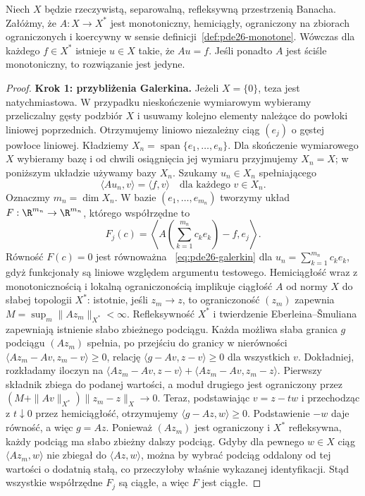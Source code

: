 \begin{twierdzenie}
\label{thm:pde26-minty}
Niech $X$ będzie rzeczywistą, separowalną, refleksywną
przestrzenią Banacha. Załóżmy, że $A:X\to X^*$ jest
monotoniczny, hemiciągły, ograniczony na zbiorach ograniczonych
i koercywny w sensie definicji~\ref{def:pde26-monotone}.
Wówczas dla każdego $f\in X^*$ istnieje $u\in X$ takie, że
$Au=f$. Jeśli ponadto $A$ jest ściśle monotoniczny,
to rozwiązanie jest jedyne.
\end{twierdzenie}
\begin{proof}
\textbf{Krok 1: przybliżenia Galerkina.}
Jeżeli $X=\{0\}$, teza jest natychmiastowa.
W przypadku nieskończenie wymiarowym wybieramy
przeliczalny gęsty podzbiór $X$ i usuwamy kolejno
elementy należące do powłoki liniowej poprzednich.
Otrzymujemy liniowo niezależny ciąg $(e_j)$
o gęstej powłoce liniowej. Kładziemy
$X_n=\operatorname{span}\{e_1,\ldots,e_n\}$.
Dla skończenie wymiarowego $X$ wybieramy bazę
i od chwili osiągnięcia jej wymiaru przyjmujemy
$X_n=X$; w poniższym układzie używamy bazy $X_n$.
Szukamy $u_n\in X_n$ spełniającego
\begin{equation}\label{eq:pde26-galerkin}
 \langle Au_n,v\rangle=\langle f,v\rangle
 \quad\text{dla każdego }v\in X_n.
\end{equation}
Oznaczmy $m_n=\dim X_n$. W bazie
$(e_1,\ldots,e_{m_n})$ tworzymy układ
$F:\R^{m_n}\to\R^{m_n}$, którego współrzędne to
\[
 F_j(c)=\left\langle A\left(\sum_{k=1}^{m_n}c_ke_k\right)
                      -f,e_j\right\rangle.
\]
Równość $F(c)=0$ jest równoważna
~\eqref{eq:pde26-galerkin} dla $u_n=\sum_{k=1}^{m_n}c_ke_k$,
gdyż funkcjonały są liniowe względem argumentu testowego.
Hemiciągłość wraz z monotonicznością i lokalną
ograniczonością implikuje ciągłość $A$ od normy $X$
do słabej topologii $X^*$: istotnie, jeśli $z_m\to z$,
to ograniczoność $(z_m)$ zapewnia
$M=\sup_m\|Az_m\|_{X^*}<\infty$.
Refleksywność $X^*$ i twierdzenie Eberleina--Šmuliana
zapewniają istnienie słabo zbieżnego podciągu.
Każda możliwa słaba granica $g$ podciągu $(Az_m)$
spełnia, po przejściu do granicy w nierówności
$\langle Az_m-Av,z_m-v\rangle\ge0$,
relację $\langle g-Av,z-v\rangle\ge0$ dla wszystkich $v$.
Dokładniej, rozkładamy iloczyn na
$\langle Az_m-Av,z-v\rangle+
\langle Az_m-Av,z_m-z\rangle$.
Pierwszy składnik zbiega do podanej wartości,
a moduł drugiego jest ograniczony przez
$(M+\|Av\|_{X^*})\|z_m-z\|_X\to0$.
Teraz,
podstawiając $v=z-tw$ i przechodząc z $t\downarrow0$
przez hemiciągłość, otrzymujemy
$\langle g-Az,w\rangle\ge0$. Podstawienie $-w$
daje równość, a więc $g=Az$.
Ponieważ $(Az_m)$ jest ograniczony i $X^*$ refleksywna,
każdy podciąg ma słabo zbieżny dalszy podciąg.
Gdyby dla pewnego $w\in X$ ciąg
$\langle Az_m,w\rangle$ nie zbiegał do
$\langle Az,w\rangle$, można by wybrać podciąg
oddalony od tej wartości o dodatnią stałą,
co przeczyłoby właśnie wykazanej identyfikacji.
Stąd wszystkie współrzędne $F_j$ są ciągłe,
a więc $F$ jest ciągłe.


\end{proof}
